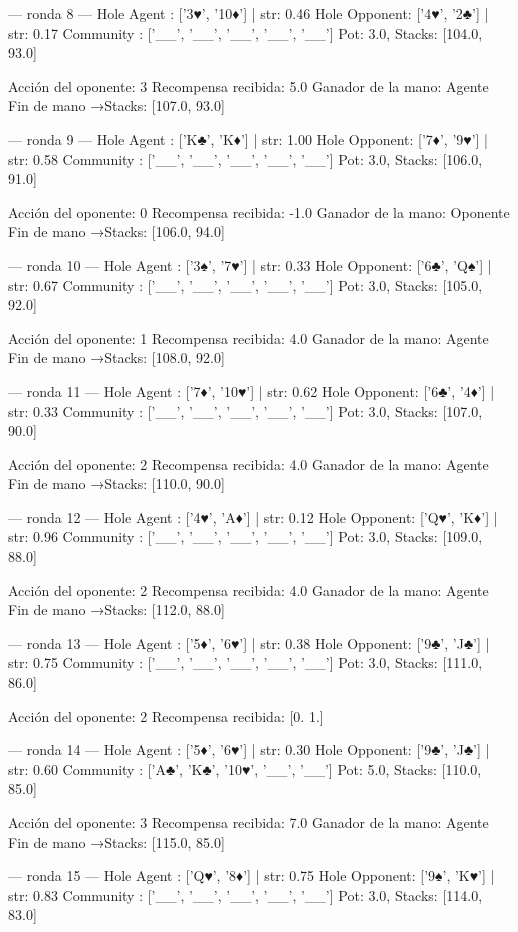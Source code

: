 --- ronda 8 ---
Hole Agent : ['3♥', '10♦'] | str: 0.46
Hole Opponent: ['4♥', '2♣'] | str: 0.17
Community  : ['__', '__', '__', '__', '__']
Pot: 3.0, Stacks: [104.0, 93.0]

Acción del oponente: 3
Recompensa recibida: 5.0
Ganador de la mano: Agente
Fin de mano →Stacks: [107.0, 93.0]


--- ronda 9 ---
Hole Agent : ['K♣', 'K♦'] | str: 1.00
Hole Opponent: ['7♦', '9♥'] | str: 0.58
Community  : ['__', '__', '__', '__', '__']
Pot: 3.0, Stacks: [106.0, 91.0]

Acción del oponente: 0
Recompensa recibida: -1.0
Ganador de la mano: Oponente
Fin de mano →Stacks: [106.0, 94.0]


--- ronda 10 ---
Hole Agent : ['3♠', '7♥'] | str: 0.33
Hole Opponent: ['6♣', 'Q♠'] | str: 0.67
Community  : ['__', '__', '__', '__', '__']
Pot: 3.0, Stacks: [105.0, 92.0]

Acción del oponente: 1
Recompensa recibida: 4.0
Ganador de la mano: Agente
Fin de mano →Stacks: [108.0, 92.0]


--- ronda 11 ---
Hole Agent : ['7♦', '10♥'] | str: 0.62
Hole Opponent: ['6♣', '4♦'] | str: 0.33
Community  : ['__', '__', '__', '__', '__']
Pot: 3.0, Stacks: [107.0, 90.0]

Acción del oponente: 2
Recompensa recibida: 4.0
Ganador de la mano: Agente
Fin de mano →Stacks: [110.0, 90.0]


--- ronda 12 ---
Hole Agent : ['4♥', 'A♦'] | str: 0.12
Hole Opponent: ['Q♥', 'K♦'] | str: 0.96
Community  : ['__', '__', '__', '__', '__']
Pot: 3.0, Stacks: [109.0, 88.0]

Acción del oponente: 2
Recompensa recibida: 4.0
Ganador de la mano: Agente
Fin de mano →Stacks: [112.0, 88.0]


--- ronda 13 ---
Hole Agent : ['5♦', '6♥'] | str: 0.38
Hole Opponent: ['9♣', 'J♣'] | str: 0.75
Community  : ['__', '__', '__', '__', '__']
Pot: 3.0, Stacks: [111.0, 86.0]

Acción del oponente: 2
Recompensa recibida: [0. 1.]

--- ronda 14 ---
Hole Agent : ['5♦', '6♥'] | str: 0.30
Hole Opponent: ['9♣', 'J♣'] | str: 0.60
Community  : ['A♣', 'K♣', '10♥', '__', '__']
Pot: 5.0, Stacks: [110.0, 85.0]

Acción del oponente: 3
Recompensa recibida: 7.0
Ganador de la mano: Agente
Fin de mano →Stacks: [115.0, 85.0]


--- ronda 15 ---
Hole Agent : ['Q♥', '8♦'] | str: 0.75
Hole Opponent: ['9♠', 'K♥'] | str: 0.83
Community  : ['__', '__', '__', '__', '__']
Pot: 3.0, Stacks: [114.0, 83.0]


